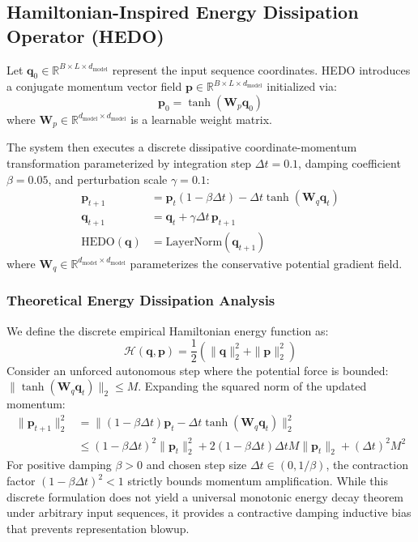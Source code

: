 \documentclass[11pt,journal,onecolumn,draftcls]{IEEEtran}
\begin{document}
\subsection{Hamiltonian-Inspired Energy Dissipation Operator (HEDO)}
Let $\mathbf{q}_0 \in \mathbb{R}^{B \times L \times d_{\text{model}}}$ represent the input sequence coordinates. HEDO introduces a conjugate momentum vector field $\mathbf{p} \in \mathbb{R}^{B \times L \times d_{\text{model}}}$ initialized via:
\begin{equation}
\mathbf{p}_0 = \tanh(\mathbf{W}_p \mathbf{q}_0)
\end{equation}
where $\mathbf{W}_p \in \mathbb{R}^{d_{\text{model}} \times d_{\text{model}}}$ is a learnable weight matrix.

The system then executes a discrete dissipative coordinate-momentum transformation parameterized by integration step $\Delta t = 0.1$, damping coefficient $\beta = 0.05$, and perturbation scale $\gamma = 0.1$:
\begin{align}
\mathbf{p}_{t+1} &= \mathbf{p}_t (1 - \beta \Delta t) - \Delta t \tanh(\mathbf{W}_q \mathbf{q}_t) \label{eq:momentum_update} \\
\mathbf{q}_{t+1} &= \mathbf{q}_t + \gamma \Delta t \, \mathbf{p}_{t+1} \label{eq:coordinate_update} \\
\text{HEDO}(\mathbf{q}) &= \text{LayerNorm}(\mathbf{q}_{t+1}) \label{eq:hedo_output}
\end{align}
where $\mathbf{W}_q \in \mathbb{R}^{d_{\text{model}} \times d_{\text{model}}}$ parameterizes the conservative potential gradient field.

\subsubsection{Theoretical Energy Dissipation Analysis}
We define the discrete empirical Hamiltonian energy function as:
\begin{equation}
\mathcal{H}(\mathbf{q}, \mathbf{p}) = \frac{1}{2} \left( \|\mathbf{q}\|_2^2 + \|\mathbf{p}\|_2^2 \right)
\end{equation}
Consider an unforced autonomous step where the potential force is bounded: $\|\tanh(\mathbf{W}_q \mathbf{q}_t)\|_2 \le M$. Expanding the squared norm of the updated momentum:
\begin{align}
\|\mathbf{p}_{t+1}\|_2^2 &= \| (1 - \beta \Delta t)\mathbf{p}_t - \Delta t \tanh(\mathbf{W}_q \mathbf{q}_t) \|_2^2 \nonumber \\
&\le (1 - \beta \Delta t)^2 \|\mathbf{p}_t\|_2^2 + 2(1 - \beta \Delta t)\Delta t M \|\mathbf{p}_t\|_2 + (\Delta t)^2 M^2
\end{align}
For positive damping $\beta > 0$ and chosen step size $\Delta t \in (0, 1/\beta)$, the contraction factor $(1 - \beta \Delta t)^2 < 1$ strictly bounds momentum amplification. While this discrete formulation does not yield a universal monotonic energy decay theorem under arbitrary input sequences, it provides a contractive damping inductive bias that prevents representation blowup.
\end{document}
